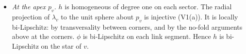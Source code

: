 \documentclass[preprint,12pt]{elsarticle}
\theoremstyle{definition}
\theoremstyle{remark}
\begin{document}
\begin{itemize}
\begin{itemize}
  V1(a)) and $\lambda_v$ is transverse to the rays.
  \item By the transversality in V1(b), the tangent sector of the outside piece lies in the closure of the complement
  of $T_x$.
  \end{itemize}
  So the sectors meet only along $\ell_1$, $w$ and $\ell_2$, and the tangent cone is an embedded disk.
\item \emph{At the apex $p_v$.} $h$ is homogeneous of degree one on each sector. The radial projection of $\lambda_v$
to the unit sphere about $p_v$ is injective (V1(a)). It is locally bi-Lipschitz: by transversality between corners,
and by the no-fold arguments above at the corners. $\phi$ is bi-Lipschitz on each link segment. Hence $h$ is
bi-Lipschitz on the star of $v$.
\end{itemize}
\end{document}
